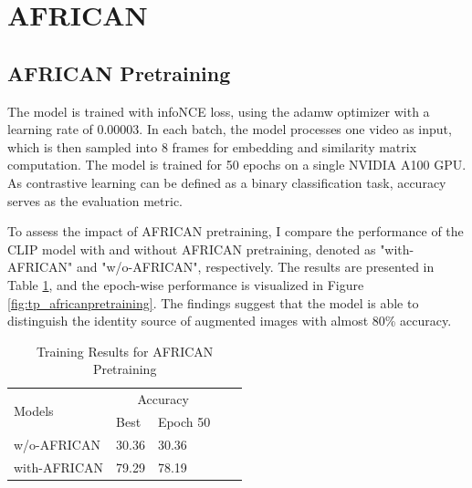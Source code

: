 






\section{AFRICAN}
\subsection{AFRICAN Pretraining}
The model is trained with infoNCE \parencite{oord2019representation} loss, using the adamw optimizer with a learning rate of 0.00003. In each batch, the model processes one video as input, which is then sampled into 8 frames for embedding and similarity matrix computation. The model is trained for 50 epochs on a single NVIDIA A100 GPU. As contrastive learning can be defined as a binary classification task, accuracy serves as the evaluation metric.

To assess the impact of AFRICAN pretraining, I compare the performance of the CLIP model with and without AFRICAN pretraining, denoted as "with-AFRICAN" and "w/o-AFRICAN", respectively. The results are presented in Table \ref{tab:africanpretrainingresults}, and the epoch-wise performance is visualized in Figure \ref{fig:tp_africanpretraining}. The findings suggest that the model is able to distinguish the identity source of augmented images with almost 80\% accuracy. 

\begin{table}[ht]
    \centering
    \caption{Training Results for AFRICAN Pretraining}
    \label{tab:africanpretrainingresults}
    \begin{tabular}{lllll}
        \toprule
        \multirow{2}{*}{Models} & \multicolumn{2}{c}{Accuracy} \\
        \cmidrule{2-3} 
        {} &  Best & Epoch 50\\
        \midrule
        w/o-AFRICAN   & 30.36 & 30.36 \\
        with-AFRICAN  & 79.29 & 78.19 \\
        \bottomrule
    \end{tabular}
\end{table}

